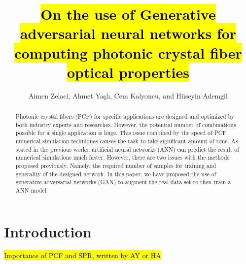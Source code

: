 \documentclass[draft, a4, 10pt, onecolumn]{IEEEtran}
\begin{document}
\title{\hl{On the use of Generative adversarial neural networks for computing photonic crystal fiber optical properties}}

\author{Aimen Zelaci, Ahmet Yaşlı, Cem Kalyoncu, and Hüseyin Ademgil}

\maketitle
	
\begin{abstract}
Photonic crystal fibers (PCF) for specific applications are designed and optimized by both industry experts and researches. However, the potential number of combinations possible for a single application is huge. This issue combined by the speed of PCF numerical simulation techniques causes the task to take significant amount of time. As stated in the previous works, artificial neural networks (ANN) can predict the result of numerical simulations much faster. However, there are two issues with the methods proposed previously. Namely, the required number of samples for training and generality of the designed network. In this paper, we have proposed the use of generative adversarial networks (GAN) to augment the real data set to then train a  ANN model.

\end{abstract}

\section{Introduction}

\hl{Importance of PCF and SPR, written by AY or HA}
\end{document}
